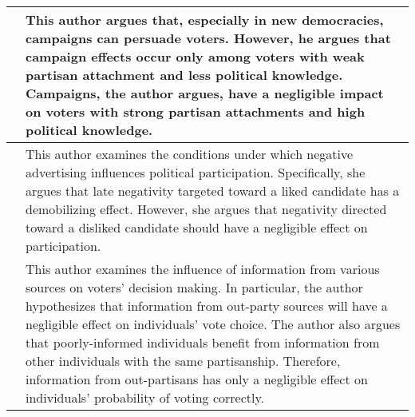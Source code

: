 \documentclass[12pt]{article}
\begin{document}
\begin{center}
\begin{longtable}{p{5cm} p{10cm}}
\hline 
\cite{Greene2011} & This author argues that, especially in new democracies, campaigns can persuade voters. However, he argues that campaign effects occur only among voters with weak partisan attachment and less political knowledge. Campaigns, the author argues, have a negligible impact on voters with strong partisan attachments and high political knowledge. \\ 
\hline 
\cite{Krupnikov2011} & This author examines the conditions under which negative advertising influences political participation. Specifically, she argues that late negativity targeted toward a liked candidate has a demobilizing effect. However, she argues that negativity directed toward a disliked candidate should have a negligible effect on participation. \\ 
\hline 
\cite{Ryan2011} & This author examines the influence of information from various sources on voters' decision making. In particular, the author hypothesizes that information from out-party sources will have a negligible effect on individuals' vote choice. The author also argues that poorly-informed individuals benefit from information from other individuals with the same partisanship. Therefore, information from out-partisans has only a negligible effect on individuals' probability of voting correctly. \\ 
\hline 
\end{longtable} 
\end{center}



\pagebreak
\singlespace \normalsize


\newpage
\end{document}
